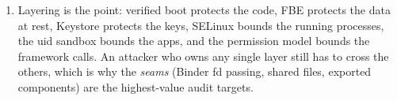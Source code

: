 \documentclass[12pt]{Training}
\begin{document}
\begin{enumerate}
\begin{enumerate}
        \item Attestation binds a key to a device state; an attacker who can influence the attestation (a compromised TEE, a patched boot state) defeats a model that trusts it.
        \item Key destruction semantics are part of the model: a key that survives a factory reset, or a key that is backed up, is a persistence primitive.
    \end{enumerate}
    \item Layering is the point: verified boot protects the code, FBE protects the data at rest, Keystore protects the keys, SELinux bounds the running processes, the uid sandbox bounds the apps, and the permission model bounds the framework calls. An attacker who owns any single layer still has to cross the others, which is why the \emph{seams} (Binder fd passing, shared files, exported components) are the highest-value audit targets.
\end{enumerate}
\end{document}
